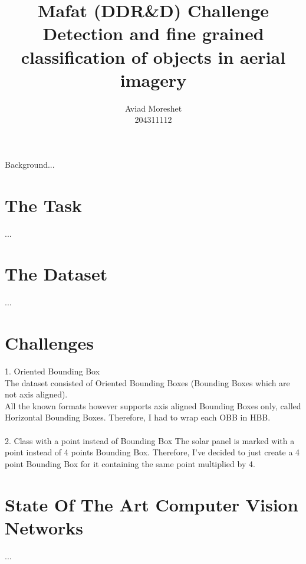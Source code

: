 \documentclass[]{article}
\title{Mafat (DDR\&D) Challenge\\
	Detection and fine grained classification of objects in aerial imagery
	}
\author{Aviad Moreshet\\204311112}
\begin{document}
\date{}
\maketitle

\begin{b}
Background...
\end{b}

\section{The Task}
...

\section{The Dataset}
...

\section{Challenges}
1. Oriented Bounding Box \\
The dataset consisted of Oriented Bounding Boxes (Bounding Boxes which are not axis aligned). \\
All the known formats however supports axis aligned Bounding Boxes only, called Horizontal Bounding Boxes. 
Therefore, I had to wrap each OBB in HBB.
\\\\
2. Class with a point instead of Bounding Box
The solar panel is marked with a point instead of 4 points Bounding Box. Therefore, I've decided to just create a 4 point Bounding Box for it containing the same point multiplied by 4.

\section{State Of The Art Computer Vision Networks}
...
\end{document}
